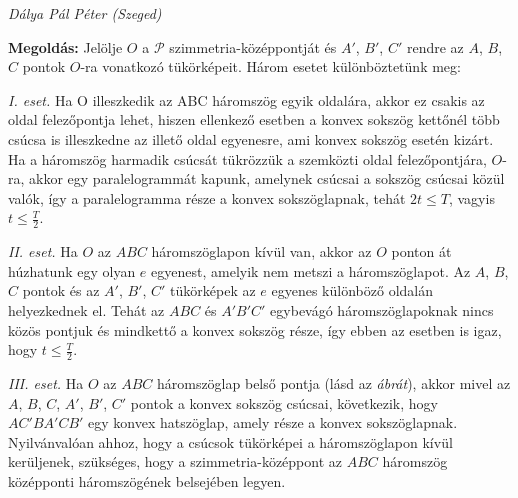 \documentclass[a4paper,10pt]{article}
\newcommand{\ki}[2]{\hfill {\it #1 (#2)}\medskip}
\begin{document}
\ki{Dálya Pál Péter}{Szeged}\medskip

{\bf Megoldás: } 
Jelölje $O$ a $\mathcal{P}$ szimmetria-középpontját és $A'$, $B'$, $C'$ rendre az $A$, $B$, $C$ pontok $O$-ra vonatkozó tükörképeit. Három esetet különböztetünk meg:

{\it I. eset.} Ha O illeszkedik az ABC háromszög egyik oldalára, akkor ez csakis az oldal felezőpontja lehet, hiszen ellenkező esetben a konvex sokszög kettőnél több csúcsa is illeszkedne az illető oldal egyenesre, ami konvex sokszög esetén kizárt. Ha a háromszög harmadik csúcsát tükrözzük a szemközti oldal felezőpontjára, $O$-ra, akkor egy paralelogrammát kapunk,  amelynek csúcsai a sokszög csúcsai közül valók, így a paralelogramma része a konvex sokszöglapnak, tehát $2t\le T$, vagyis $t\le \frac T 2$.

{\it II. eset.} Ha $O$ az $ABC$ háromszöglapon kívül van, akkor az $O$ ponton át húzhatunk egy olyan $e$ egyenest, amelyik nem metszi a háromszöglapot. Az $A$, $B$, $C$ pontok és az $A'$, $B'$, $C'$ tükörképek az $e$ egyenes különböző oldalán helyezkednek el. Tehát az $ABC$ és $A'B'C'$ egybevágó háromszöglapoknak nincs közös pontjuk és mindkettő a konvex sokszög része, így ebben az esetben is igaz, hogy $t \le \frac T 2$.

{\it III. eset.} Ha $O$ az $ABC$ háromszöglap belső pontja (lásd az \emph{ábrát}), akkor mivel az $A$, $B$, $C$, $A'$, $B'$, $C'$ pontok a konvex sokszög csúcsai, következik, hogy $AC'BA'CB'$ egy konvex hatszöglap, amely része a konvex sokszöglapnak. Nyilvánvalóan ahhoz, hogy a csúcsok tükörképei a háromszöglapon kívül kerüljenek, szükséges, hogy a szimmetria-középpont az $ABC$ háromszög középponti háromszögének belsejében legyen. 
\end{document}
